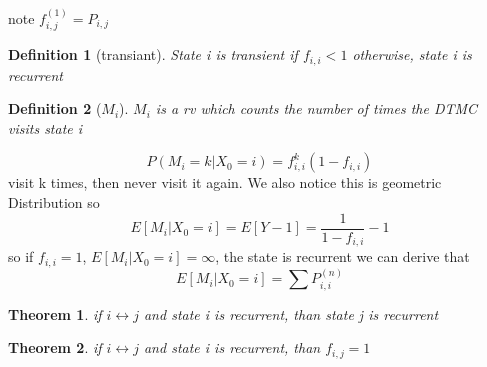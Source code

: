\documentclass[10pt]{article}
\theoremstyle{break}
\newtheorem{thm}{Theorem}[subsection]
\newtheorem{defn}{Definition}[subsection]
\begin{document}
            note $f_{i,j}^{(1)}=P_{i,j}$
            \begin{defn}[transiant]
                State i is transient if $f_{i,i}<1$ otherwise, state i is recurrent
            \end{defn}
            \begin{defn}[$M_i$]
                $M_i$ is a rv which counts the number of times the DTMC visits state i
            \end{defn}
            $$P(M_i=k|X_0=i)=f_{i,i}^k(1-f_{i,i})$$
            visit k times, then never visit it again. We also notice this is geometric Distribution
            so $$E[M_i|X_0=i]=E[Y-1]=\frac{1}{1-f_{i,i}}-1$$
            so if $f_{i,i}=1$, $E[M_i|X_0=i]=\infty$, the state is recurrent
            we can derive that $$E[M_i|X_0=i]=\sum P_{i,i}^{(n)}$$
            \begin{thm}
                if $i\leftrightarrow j$ and state i is recurrent, than state j is recurrent 
            \end{thm}
            \begin{thm}
                if $i\leftrightarrow j$ and state i is recurrent, than $f_{i,j}=1$
            \end{thm}
\end{document}
